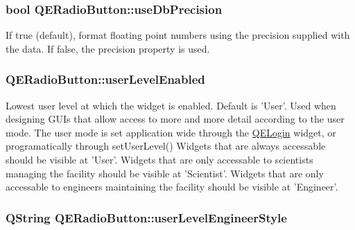 \hypertarget{classQERadioButton_ab91967d814660edc9857b2d985997c26}{
\subsubsection[{useDbPrecision}]{\setlength{\rightskip}{0pt plus 5cm}bool QERadioButton::useDbPrecision}}
\label{classQERadioButton_ab91967d814660edc9857b2d985997c26}
If true (default), format floating point numbers using the precision supplied with the data. If false, the precision property is used. \hypertarget{classQERadioButton_ae020d45daeac4979a2b917159bba1c3f}{
\subsubsection[{userLevelEnabled}]{ QERadioButton::userLevelEnabled}}
\label{classQERadioButton_ae020d45daeac4979a2b917159bba1c3f}
Lowest user level at which the widget is enabled. Default is 'User'. Used when designing GUIs that allow access to more and more detail according to the user mode. The user mode is set application wide through the \hyperlink{classQELogin}{QELogin} widget, or programatically through setUserLevel() Widgets that are always accessable should be visible at 'User'. Widgets that are only accessable to scientists managing the facility should be visible at 'Scientist'. Widgets that are only accessable to engineers maintaining the facility should be visible at 'Engineer'. \hypertarget{classQERadioButton_a6e05c0168077b53a67ef237eb5af1939}{
\subsubsection[{userLevelEngineerStyle}]{\setlength{\rightskip}{0pt plus 5cm}QString QERadioButton::userLevelEngineerStyle}}
